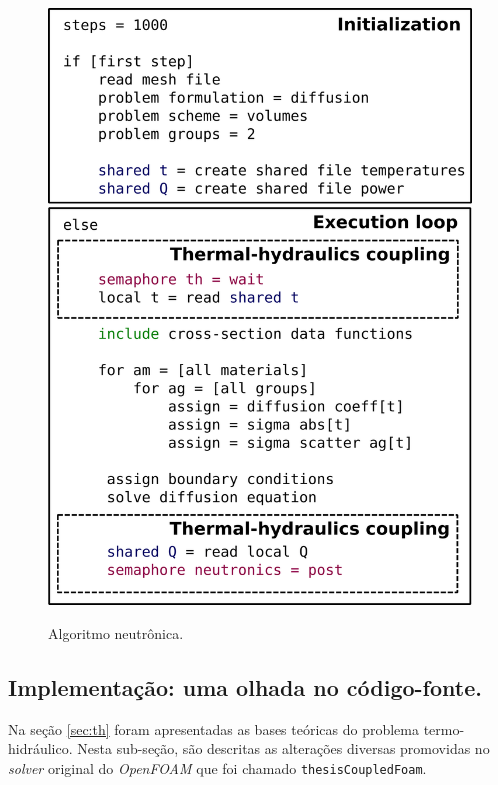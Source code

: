 \begin{figure}[htb]
  \caption{Algoritmo neutrônica.}
  \centering\includegraphics[scale=0.5]{figuras/algoritmos_milonga.png}
  \label{fig:algo_neutronica}
\end{figure}





\subsection{Implementação: uma olhada no código-fonte.}
\label{subsec:detth}
Na seção \ref{sec:th} foram apresentadas as bases teóricas do problema termo-hidráulico.
Nesta sub-seção, são
descritas as alterações diversas promovidas no \textit{solver} original do \textit{OpenFOAM}
que foi chamado \texttt{thesisCoupledFoam}.

